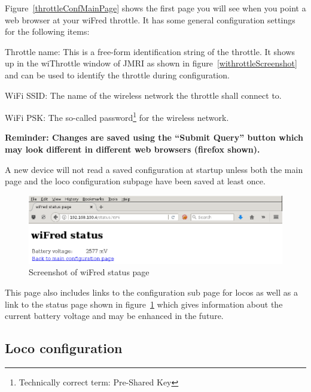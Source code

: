 \documentclass[11pt,a4paper]{scrartcl}
\begin{document}
Figure~\ref{throttleConfMainPage} shows the first page you will see when you point a web browser at your wiFred throttle. It has some general configuration settings for the following items:

\begin{description}
\item{Throttle name:} This is a free-form identification string of the throttle. It shows up in the wiThrottle window of JMRI as shown in figure~\ref{withrottleScreenshot} and can be used to identify the throttle during configuration.
\item{WiFi SSID:} The name of the wireless network the throttle shall connect to.
\item{WiFi PSK:} The so-called password\footnote{Technically correct term: Pre-Shared Key} for the wireless network.  
\end{description}

\textbf{Reminder: Changes are saved using the ``Submit Query'' button which may look different in different web browsers (firefox shown).}

A new device will not read a saved configuration at startup unless both the main page and the loco configuration subpage have been saved at least once.

\begin{figure}[tbh]
  \centering
  \includegraphics[width=0.8 \textwidth]{images/screenShot_status}
  \caption{Screenshot of wiFred status page}
  \label{throttleConfigStatusPage}
\end{figure}

This page also includes links to the configuration sub page for locos as well as a link to the status page shown in figure~\ref{throttleConfigStatusPage} which gives information about the current battery voltage and may be enhanced in the future.

\subsection{Loco configuration} \label{throttle_LocoConf}
\end{document}
